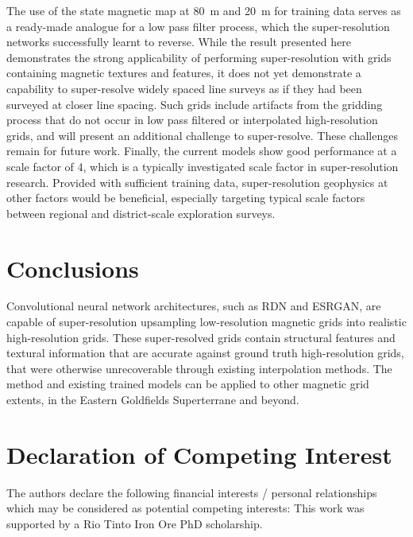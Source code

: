 \documentclass[manuscript.tex]{subfiles}
\begin{document}
The use of the state magnetic map at \SI{80}{\metre} and \SI{20}{\metre} for training data serves as a ready-made analogue for a low pass filter process, which the super-resolution networks successfully learnt to reverse.
While the result presented here demonstrates the strong applicability of performing super-resolution with grids containing magnetic textures and features, it does not yet demonstrate a capability to super-resolve widely spaced line surveys as if they had been surveyed at closer line spacing.
Such grids include artifacts from the gridding process that do not occur in low pass filtered or interpolated high-resolution grids, and will present an additional challenge to super-resolve.
These challenges remain for future work.
Finally, the current models show good performance at a scale factor of \num{4}, which is a typically investigated scale factor in super-resolution research.
Provided with sufficient training data, super-resolution geophysics at other factors would be beneficial, especially targeting typical scale factors between regional and district-scale exploration surveys.

\section{Conclusions}
Convolutional neural network architectures, such as RDN and ESRGAN, are capable of super-resolution upsampling low-resolution magnetic grids into realistic high-resolution grids.
These super-resolved grids contain structural features and textural information that are accurate against ground truth high-resolution grids, that were otherwise unrecoverable through existing interpolation methods.
The method and existing trained models can be applied to other magnetic grid extents, in the Eastern Goldfields Superterrane and beyond.

\section{Declaration of Competing Interest}
The authors declare the following financial interests / personal relationships which may be considered as potential competing interests: This work was supported by a Rio Tinto Iron Ore PhD scholarship.

\printbibliography{}
\end{document}
